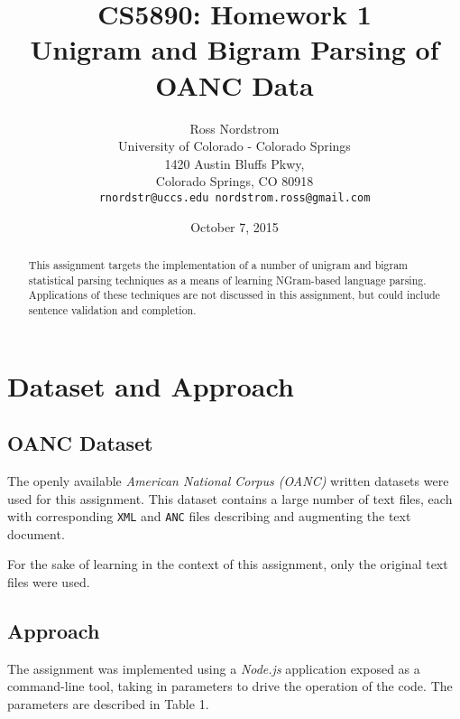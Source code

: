 \documentclass[11pt]{article}
\title{CS5890: Homework 1 \\ Unigram and Bigram Parsing of OANC Data}
\author{Ross Nordstrom \\
  University of Colorado - Colorado Springs \\
  1420 Austin Bluffs Pkwy, \\
  Colorado Springs, CO 80918 \\
  {\tt rnordstr@uccs.edu nordstrom.ross@gmail.com} \\}
\date{October 7, 2015}
\begin{document}
\maketitle
\begin{abstract}
  This assignment targets the implementation of a number of unigram and bigram
  statistical parsing techniques as a means of learning NGram-based language
  parsing.  Applications of these techniques are not discussed in this
  assignment, but could include sentence validation and completion.
\end{abstract}

\section{Dataset and Approach}
\label{datasetAndApproach}

\subsection{OANC Dataset}

The openly available {\em American National Corpus (OANC)} written datasets
were used for this assignment. This dataset contains a large number of text
files, each with corresponding {\tt XML} and {\tt ANC} files describing and
augmenting the text document.

For the sake of learning in the context of this assignment, only the original
text files were used.

\subsection{Approach}

The assignment was implemented using a {\em Node.js} application exposed as
a command-line tool, taking in parameters to drive the operation of the
code. The parameters are described in Table 1.
\end{document}
